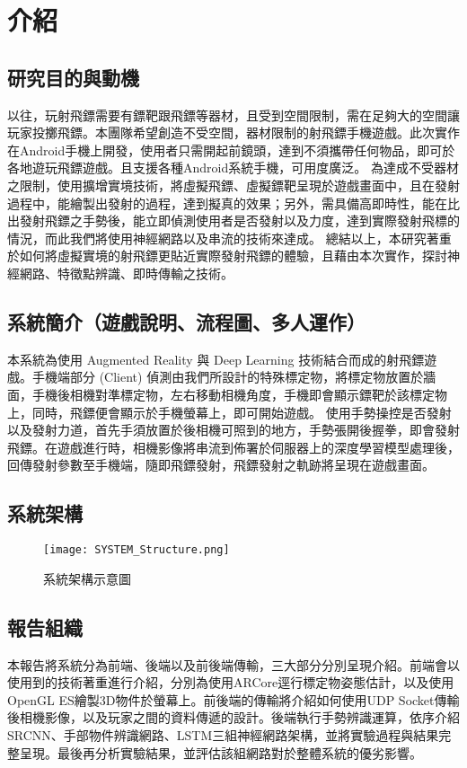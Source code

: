 \chapter{介紹}
\section{研究目的與動機}

以往，玩射飛鏢需要有鏢靶跟飛鏢等器材，且受到空間限制，需在足夠大的空間讓玩家投擲飛鏢。本團隊希望創造不受空間，器材限制的射飛鏢手機遊戲。此次實作在Android手機上開發，使用者只需開起前鏡頭，達到不須攜帶任何物品，即可於各地遊玩飛鏢遊戲。且支援各種Android系統手機，可用度廣泛。
為達成不受器材之限制，使用擴增實境技術，將虛擬飛鏢、虛擬鏢靶呈現於遊戲畫面中，且在發射過程中，能繪製出發射的過程，達到擬真的效果；另外，需具備高即時性，能在比出發射飛鏢之手勢後，能立即偵測使用者是否發射以及力度，達到實際發射飛標的情況，而此我們將使用神經網路以及串流的技術來達成。
總結以上，本研究著重於如何將虛擬實境的射飛鏢更貼近實際發射飛鏢的體驗，且藉由本次實作，探討神經網路、特徵點辨識、即時傳輸之技術。


\section{系統簡介（遊戲說明、流程圖、多人運作）}

本系統為使用 Augmented Reality 與 Deep Learning 技術結合而成的射飛鏢遊戲。手機端部分 (Client) 偵測由我們所設計的特殊標定物，將標定物放置於牆面，手機後相機對準標定物，左右移動相機角度，手機即會顯示鏢靶於該標定物上，同時，飛鏢便會顯示於手機螢幕上，即可開始遊戲。
使用手勢操控是否發射以及發射力道，首先手須放置於後相機可照到的地方，手勢張開後握拳，即會發射飛鏢。在遊戲進行時，相機影像將串流到佈署於伺服器上的深度學習模型處理後，回傳發射參數至手機端，隨即飛鏢發射，飛鏢發射之軌跡將呈現在遊戲畫面。
    

\section{系統架構}
\begin{figure}[H]
    \centering
    \texttt{[image: SYSTEM\_Structure.png]}
    \caption{系統架構示意圖}
    \label{fig:系統架構示意圖}
\end{figure}  
    
\section{報告組織}
本報告將系統分為前端、後端以及前後端傳輸，三大部分分別呈現介紹。前端會以使用到的技術著重進行介紹，分別為使用ARCore逕行標定物姿態估計，以及使用OpenGL ES繪製3D物件於螢幕上。前後端的傳輸將介紹如何使用UDP Socket傳輸後相機影像，以及玩家之間的資料傳遞的設計。後端執行手勢辨識運算，依序介紹SRCNN、手部物件辨識網路、LSTM三組神經網路架構，並將實驗過程與結果完整呈現。最後再分析實驗結果，並評估該組網路對於整體系統的優劣影響。

